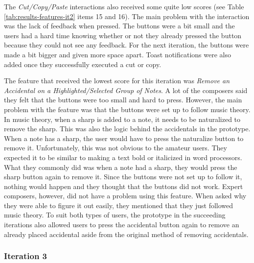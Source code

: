 				The \textit{Cut/Copy/Paste} interactions also received some quite low scores (see Table \ref{tab:results-features-it2} items 15 and 16). The main problem with the interaction was the lack of feedback when pressed. The buttons were a bit small and the users had a hard time knowing whether or not they already pressed the button because they could not see any feedback. For the next iteration, the buttons were made a bit bigger and given more space apart. Toast notifications were also added once they successfully executed a cut or copy. 

				The feature that received the lowest score for this iteration was \textit{Remove an Accidental on a Highlighted/Selected Group of Notes}. A lot of the composers said they felt that the buttons were too small and hard to press. However, the main problem with the feature was that the buttons were set up to follow music theory. In music theory, when a sharp is added to a note, it needs to be naturalized to remove the sharp. This was also the logic behind the accidentals in the prototype. When a note has a sharp, the user would have to press the naturalize button to remove it. Unfortunately, this was not obvious to the amateur users. They expected it to be similar to making a text bold or italicized in word processors. What they commonly did was when a note had a sharp, they would press the sharp button again to remove it. Since the buttons were not set up to follow it, nothing would happen and they thought that the buttons did not work. Expert composers, however, did not have a problem using this feature. When asked why they were able to figure it out easily, they mentioned that they just followed music theory. To suit both types of users, the prototype in the succeeding iterations also allowed users to press the accidental button again to remove an already placed accidental aside from the original method of removing accidentals.

			\subsubsection{Iteration 3} %
			\label{sub:iteration_3}
			

